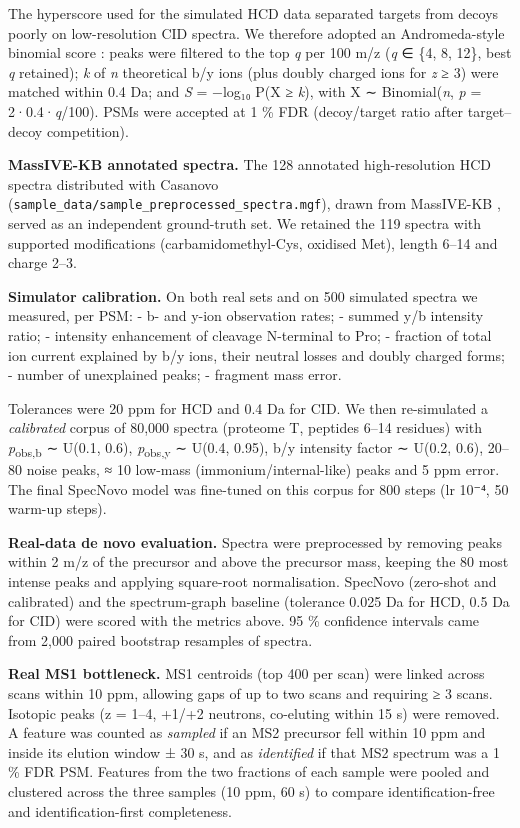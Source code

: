 \documentclass[pdflatex,sn-mathphys-num]{sn-jnl}
\begin{document}
The hyperscore used for the simulated HCD data separated targets from decoys poorly on low-resolution CID spectra. We therefore adopted an Andromeda-style binomial score \cite{cox2011}: peaks were filtered to the top \emph{q} per 100 m/z (\emph{q} ∈ \{4, 8, 12\}, best \emph{q} retained); \emph{k} of \emph{n} theoretical b/y ions (plus doubly charged ions for \emph{z} ≥ 3) were matched within 0.4 Da; and \emph{S} = −log₁₀ P(X ≥ \emph{k}), with X ∼ Binomial(\emph{n}, \emph{p} = 2·0.4·\emph{q}/100). PSMs were accepted at 1 \% FDR (decoy/target ratio after target--decoy competition).

\textbf{MassIVE-KB annotated spectra.} The 128 annotated high-resolution HCD spectra distributed with Casanovo \cite{yilmaz2024} (\texttt{sample\_data/sample\_preprocessed\_spectra.mgf}), drawn from MassIVE-KB \cite{wang2018}, served as an independent ground-truth set. We retained the 119 spectra with supported modifications (carbamidomethyl-Cys, oxidised Met), length 6--14 and charge 2--3.

\textbf{Simulator calibration.} On both real sets and on 500 simulated spectra we measured, per PSM: - b- and y-ion observation rates; - summed y/b intensity ratio; - intensity enhancement of cleavage N-terminal to Pro; - fraction of total ion current explained by b/y ions, their neutral losses and doubly charged forms; - number of unexplained peaks; - fragment mass error.

Tolerances were 20 ppm for HCD and 0.4 Da for CID. We then re-simulated a \emph{calibrated} corpus of 80,000 spectra (proteome T, peptides 6--14 residues) with \emph{p}\textsubscript{obs,b} ∼ U(0.1, 0.6), \emph{p}\textsubscript{obs,y} ∼ U(0.4, 0.95), b/y intensity factor ∼ U(0.2, 0.6), 20--80 noise peaks, ≈ 10 low-mass (immonium/internal-like) peaks and 5 ppm error. The final SpecNovo model was fine-tuned on this corpus for 800 steps (lr 10⁻⁴, 50 warm-up steps).

\textbf{Real-data de novo evaluation.} Spectra were preprocessed by removing peaks within 2 m/z of the precursor and above the precursor mass, keeping the 80 most intense peaks and applying square-root normalisation. SpecNovo (zero-shot and calibrated) and the spectrum-graph baseline (tolerance 0.025 Da for HCD, 0.5 Da for CID) were scored with the metrics above. 95 \% confidence intervals came from 2,000 paired bootstrap resamples of spectra.

\textbf{Real MS1 bottleneck.} MS1 centroids (top 400 per scan) were linked across scans within 10 ppm, allowing gaps of up to two scans and requiring ≥ 3 scans. Isotopic peaks (z = 1--4, +1/+2 neutrons, co-eluting within 15 s) were removed. A feature was counted as \emph{sampled} if an MS2 precursor fell within 10 ppm and inside its elution window ± 30 s, and as \emph{identified} if that MS2 spectrum was a 1 \% FDR PSM. Features from the two fractions of each sample were pooled and clustered across the three samples (10 ppm, 60 s) to compare identification-free and identification-first completeness.
\end{document}
